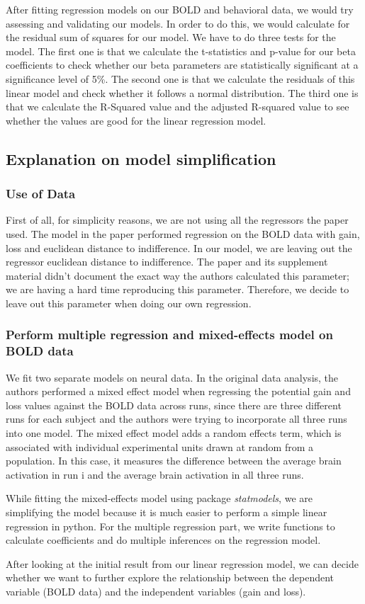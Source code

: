 After fitting regression models on our BOLD and behavioral data, we would try 
assessing and validating our models. In order to do this, we would calculate 
for the residual sum of squares for our model. We have to do three tests for 
the model. The first one is that we calculate the t-statistics and p-value for 
our beta coefficients to check whether our beta parameters are statistically 
significant at a significance level of 5\%. The second one is that we calculate
the residuals of this linear model and check whether it follows a normal 
distribution. The third one is that we calculate the R-Squared value and the 
adjusted R-squared value to see whether the values are good for the linear 
regression model.\\


\subsection{Explanation on model simplification}

\subsubsection{Use of Data}
\indent \indent First of all, for simplicity reasons, we are not using all the 
regressors the paper used. The model in the paper performed regression on the 
BOLD data with gain, loss and euclidean distance to indifference. In our model,
we are leaving out the regressor euclidean distance to indifference. The paper 
and its supplement material didn't document the exact way the authors 
calculated this parameter; we are having a hard time reproducing this 
parameter. Therefore, we decide to leave out this parameter when doing our own 
regression.

\subsubsection{Perform multiple regression and mixed-effects model on BOLD data}

\indent \indent We fit two separate models on neural data. In the 
original data analysis, the authors performed a mixed effect model when 
regressing the potential gain and loss values against the BOLD data across 
runs, since there are three different runs for each subject and the authors 
were trying to incorporate all three runs into one model. The mixed effect 
model adds a random effects term, which is associated with individual 
experimental units drawn at random from a population. In this case, it 
measures the difference between the average brain activation in run i and the 
average brain activation in all three runs.

While fitting the mixed-effects model using package \emph{statmodels}, we 
are simplifying the model because it is much easier to perform a simple 
linear regression in python. For the multiple regression part, we write functions 
to calculate coefficients and do multiple inferences on the regression model.

After looking at the initial result from our linear regression model, we can 
decide whether we want to further explore the relationship between the 
dependent variable (BOLD data) and the independent variables (gain and loss).
